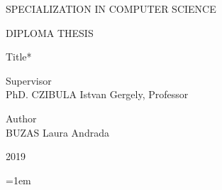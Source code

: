 \documentclass[12pt]{extreport}
\begin{document}
\begin{titlepage}
        \begin{center}
        {\Large SPECIALIZATION IN COMPUTER SCIENCE}
        \end{center}

        \vfill

        \begin{center}
        {\LARGE DIPLOMA THESIS}
        \end{center}

        \begin{center}
        {\Huge *Title*}
        \end{center}

        \vfill

        \begin{flushleft}
        {\LARGE Supervisor \\ PhD. CZIBULA Istvan Gergely, Professor}
        \end{flushleft}

        \begin{flushright}
        {\Large Author \\ BUZAS Laura Andrada}
        \end{flushright}

        \vfill

        \begin{center}
        {\LARGE 2019}
    \end{center}

    \end{titlepage}
    \restoregeometry
    \pagestyle{plain}

    

    \tableofcontents
    \pagebreak

    

    
    
    
    
    
    
    
    
    \titleformat{\chapter}{}{}{0em}{\bfseries\LARGE}
    \nocite{*}
    \emergencystretch=1em
    \printbibliography[heading=bibintoc, title={}]
\end{document}
